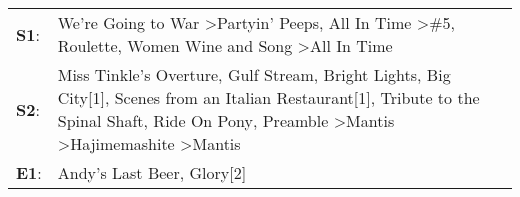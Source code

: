 \begin{supertabular}{p{0.03\textwidth}p{0.92\textwidth}}
 \textbf{S1}:  &                                                                                                                                                                            We're Going to War\textsuperscript{} \textgreater \enspace Partyin' Peeps\textsuperscript{}, \enspace All In Time\textsuperscript{} \textgreater \enspace \#5\textsuperscript{}, \enspace Roulette\textsuperscript{}, \enspace Women Wine and Song\textsuperscript{} \textgreater \enspace All In Time\textsuperscript{}  \enspace  \\
 \textbf{S2}:  &  Miss Tinkle's Overture\textsuperscript{}, \enspace Gulf Stream\textsuperscript{}, \enspace Bright Lights, Big City[1]\textsuperscript{}, \enspace Scenes from an Italian Restaurant[1]\textsuperscript{}, \enspace Tribute to the Spinal Shaft\textsuperscript{}, \enspace Ride On Pony\textsuperscript{}, \enspace Preamble\textsuperscript{} \textgreater \enspace Mantis\textsuperscript{} \textgreater \enspace Hajimemashite\textsuperscript{} \textgreater \enspace Mantis\textsuperscript{}  \enspace  \\
 \textbf{E1}:  &                                                                                                                                                                                                                                                                                                                                                                                                                             Andy's Last Beer\textsuperscript{}, \enspace Glory[2]\textsuperscript{}  \enspace  \\
\end{supertabular}

